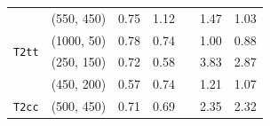 \begin{table}[!t]
\begin{tabular}{ llccccc }
                                            & (550, 450)    & 0.75 & 1.12 &  & 1.47 & 1.03 \\ [0.5ex]
    \multirow{2}{*}{\texttt{T2tt}}          & (1000, 50)    & 0.78 & 0.74 &  & 1.00 & 0.88 \\
                                            & (250, 150)    & 0.72 & 0.58 &  & 3.83 & 2.87 \\
                                            & (450, 200)    & 0.57 & 0.74 &  & 1.21 & 1.07 \\ [0.5ex]
    \multirow{1}{*}{\texttt{T2cc}}          & (500, 450)    & 0.71 & 0.69 &  & 2.35 & 2.32 \\ [0.5ex]
    \hline
  \end{tabular}
\end{table}

